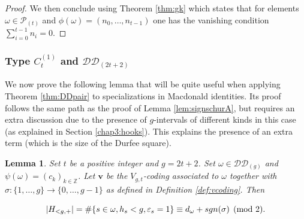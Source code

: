 \documentclass[11pt,letterpaper]{amsart}
\def\bbbz{\mathbb Z}
\def\ccdd{\mathcal {DD}}
\def\ccp{\mathcal P}
\def\sgn{{\rm sgn}}
\newtheorem{lm}[df]{Lemma}
\numberwithin{equation}{section}
\numberwithin{df}{section}
\begin{document}
\begin{proof}
We then conclude using Theorem \ref{thm:gk} which states that for elements $\omega\in\ccp_{(t)}$ and $\phi(\omega)=(n_0,\dots,n_{t-1})$ one has the vanishing condition $\sum_{i=0}^{t-1} n_i=0$. 
\end{proof}

\subsubsection{Type $C^{(1)}_{t}$ and $\ccdd_{(2t+2)}$}

We now prove the following lemma that will be quite useful when applying Theorem \ref{thm:DDpair} to specializations in Macdonald identities. Its proof follows the same path as the proof of Lemma \ref{lem:signschurA}, but requires an extra discussion due to the presence of $g$-intervals of different kinds in this case (as explained in Section \ref{chap3:hooks}). This explains the presence of an extra term (which is the size of the Durfee square).
\begin{lm}\label{lem:signschur}
Set $t$ be a positive integer and $g=2t+2$.
Set $\omega\in\ccdd_{(g)}$ and $\psi(\omega)=(c_k)_{k\in\bbbz}$. 
Let $\mathbf{v}$ be the $V_{g,t}$-coding associated to $\omega$ together with $\sigma : \lbrace 1,\dots,g\rbrace\rightarrow \lbrace 0,\dots,g-1\rbrace$ as defined in Definition \ref{def:vcoding}. Then

\begin{equation}
\lvert H_{<g,+}\rvert=\#\lbrace s\in\omega, h_s<g, \varepsilon_s=1\rbrace\equiv d_\omega+\sgn(\sigma)\pmod{2}.
\end{equation}
\end{lm}
\end{document}

